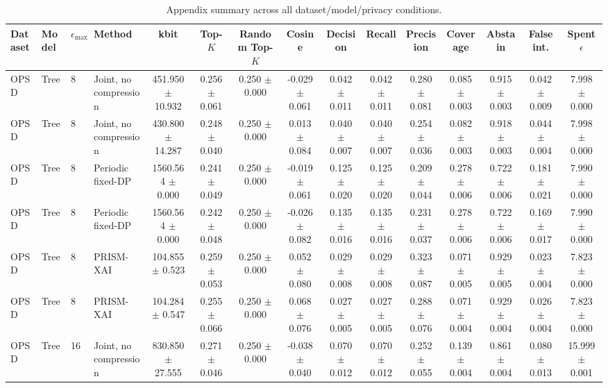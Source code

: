 \begin{table}[t]
\caption{Appendix summary across all dataset/model/privacy conditions.}
\label{tab:appendix-conditions}
\centering
\scriptsize
\setlength{\tabcolsep}{2.5pt}
\begin{tabular}{llllccccccccccc}
\toprule
Dataset & Model & $\epsilon_{\max}$ & Method & kbit & Top-$K$ & Random Top-$K$ & Cosine & Decision & Recall & Precision & Coverage & Abstain & False int. & Spent $\epsilon$ \\
\midrule
OPSD & Tree & 8 & Joint, no compression & 451.950 $\pm$ 10.932 & 0.256 $\pm$ 0.061 & 0.250 $\pm$ 0.000 & -0.029 $\pm$ 0.061 & 0.042 $\pm$ 0.011 & 0.042 $\pm$ 0.011 & 0.280 $\pm$ 0.081 & 0.085 $\pm$ 0.003 & 0.915 $\pm$ 0.003 & 0.042 $\pm$ 0.009 & 7.998 $\pm$ 0.000 \\
OPSD & Tree & 8 & Joint, no compression & 430.800 $\pm$ 14.287 & 0.248 $\pm$ 0.040 & 0.250 $\pm$ 0.000 & 0.013 $\pm$ 0.084 & 0.040 $\pm$ 0.007 & 0.040 $\pm$ 0.007 & 0.254 $\pm$ 0.036 & 0.082 $\pm$ 0.003 & 0.918 $\pm$ 0.003 & 0.044 $\pm$ 0.004 & 7.998 $\pm$ 0.000 \\
OPSD & Tree & 8 & Periodic fixed-DP & 1560.564 $\pm$ 0.000 & 0.241 $\pm$ 0.049 & 0.250 $\pm$ 0.000 & -0.019 $\pm$ 0.061 & 0.125 $\pm$ 0.020 & 0.125 $\pm$ 0.020 & 0.209 $\pm$ 0.044 & 0.278 $\pm$ 0.006 & 0.722 $\pm$ 0.006 & 0.181 $\pm$ 0.021 & 7.990 $\pm$ 0.000 \\
OPSD & Tree & 8 & Periodic fixed-DP & 1560.564 $\pm$ 0.000 & 0.242 $\pm$ 0.048 & 0.250 $\pm$ 0.000 & -0.026 $\pm$ 0.082 & 0.135 $\pm$ 0.016 & 0.135 $\pm$ 0.016 & 0.231 $\pm$ 0.037 & 0.278 $\pm$ 0.006 & 0.722 $\pm$ 0.006 & 0.169 $\pm$ 0.017 & 7.990 $\pm$ 0.000 \\
OPSD & Tree & 8 & PRISM-XAI & 104.855 $\pm$ 0.523 & 0.259 $\pm$ 0.053 & 0.250 $\pm$ 0.000 & 0.052 $\pm$ 0.080 & 0.029 $\pm$ 0.008 & 0.029 $\pm$ 0.008 & 0.323 $\pm$ 0.087 & 0.071 $\pm$ 0.005 & 0.929 $\pm$ 0.005 & 0.023 $\pm$ 0.004 & 7.823 $\pm$ 0.000 \\
OPSD & Tree & 8 & PRISM-XAI & 104.284 $\pm$ 0.547 & 0.255 $\pm$ 0.066 & 0.250 $\pm$ 0.000 & 0.068 $\pm$ 0.076 & 0.027 $\pm$ 0.005 & 0.027 $\pm$ 0.005 & 0.288 $\pm$ 0.076 & 0.071 $\pm$ 0.004 & 0.929 $\pm$ 0.004 & 0.026 $\pm$ 0.004 & 7.823 $\pm$ 0.000 \\
OPSD & Tree & 16 & Joint, no compression & 830.850 $\pm$ 27.555 & 0.271 $\pm$ 0.046 & 0.250 $\pm$ 0.000 & -0.038 $\pm$ 0.040 & 0.070 $\pm$ 0.012 & 0.070 $\pm$ 0.012 & 0.252 $\pm$ 0.055 & 0.139 $\pm$ 0.004 & 0.861 $\pm$ 0.004 & 0.080 $\pm$ 0.013 & 15.999 $\pm$ 0.001 \\

\end{tabular}
\end{table}
